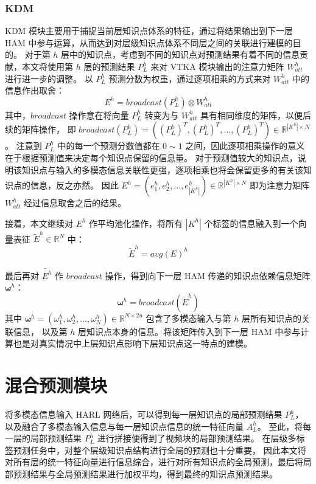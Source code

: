     \subsubsection{KDM}
    KDM 模块主要用于捕捉当前层知识点体系的特征，通过将结果输出到下一层 HAM 中参与运算，从而达到对层级知识点体系不同层之间的关联进行建模的目的。
    对于第 $h$ 层中的知识点，考虑到不同的知识点对预测结果有着不同的信息贡献，本文将使用第 $h$ 层的预测结果 $P_L^h$ 来对 VTKA 模块输出的注意力矩阵 $W_{att}^h$ 进行进一步的调整。
    以 $P_L^h$ 预测分数为权重，通过逐项相乘的方式来对 $W_{att}^h$ 中的信息作出取舍：
    \begin{equation}
        E^h = broadcast\left(P_L^h\right) \otimes W_{att}^h
    \end{equation}
    其中，$broadcast$ 操作意在将向量 $P_L^h$ 转变为与 $W_{att}^h$ 具有相同维度的矩阵，以便后续的矩阵操作，
    即 $broadcast\left(P_L^h\right) = \left(\left(P_L^h\right)^T, \left(P_L^h\right)^T, \dots, \left(P_L^h\right)^T\right) \in \mathbb{R}^{\left|K^h\right| \times N}$。
    注意到 $P_L^h$ 中的每一个预测分数值都在 $0 \sim 1$ 之间，因此逐项相乘操作的意义在于根据预测值来决定每个知识点保留的信息量。
    对于预测值较大的知识点，说明该知识点与输入的多模态信息关联性更强，逐项相乘也将会保留更多的有关该知识点的信息，反之亦然。
    因此 $E^h = (e_1^h, e_2^h, \dots, e_{\left|K^h\right|}^h) \in \mathbb{R}^{\left|K^h\right| \times N}$ 即为注意力矩阵 $W_{att}^h$ 经过信息取舍之后的结果。

    接着，本文继续对 $E^h$ 作平均池化操作，将所有 $\left|K^h\right|$ 个标签的信息融入到一个向量表征 $\tilde{E}^h \in \mathbb{R}^{N}$ 中：
    \begin{equation}
        \tilde{E}^h = avg\left(E\right)^h
    \end{equation}

    最后再对 $\tilde{E^h}$ 作 $broadcast$ 操作，得到向下一层 HAM 传递的知识点依赖信息矩阵 $\boldsymbol{\omega}^h$：
    \begin{equation}
        \boldsymbol{\omega}^h = broadcast\left(\tilde{E}^h\right)
    \end{equation}
    其中 $\boldsymbol{\omega}^h = (\omega_1^h, \omega_2^h, \dots, \omega_N^h) \in \mathbb{R}^{N \times 2u}$ 包含了多模态输入与第 $h$ 层所有知识点的关联信息，
    以及第 $h$ 层知识点本身的信息。将该矩阵传入到下一层 HAM 中参与计算也是对真实情况中上层知识点影响下层知识点这一特点的建模。


\section{混合预测模块}
    将多模态信息输入 HARL 网络后，可以得到每一层知识点的局部预测结果 $P_L^h$，以及融合了多模态输入信息与每一层知识点信息的统一特征向量 $A_L^h$。
    至此，将每一层的局部预测结果 $P_L^h$ 进行拼接便得到了视频块的局部预测结果。
    在层级多标签预测任务中，对整个层级知识点结构进行全局的预测也十分重要，
    因此本文将对所有层的统一特征向量进行信息综合，进行对所有知识点的全局预测，最后将局部预测结果与全局预测结果进行加权平均，得到最终的知识点预测结果。


